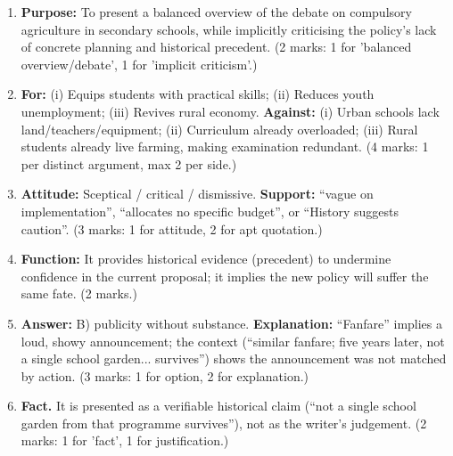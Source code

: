 \documentclass[11pt]{article}
\begin{document}
\begin{corrige}
\begin{enumerate}
\item \textbf{Purpose:} To present a balanced overview of the debate on compulsory agriculture in secondary schools, while implicitly criticising the policy's lack of concrete planning and historical precedent. (2 marks: 1 for 'balanced overview/debate', 1 for 'implicit criticism'.)
\item \textbf{For:} (i) Equips students with practical skills; (ii) Reduces youth unemployment; (iii) Revives rural economy. \textbf{Against:} (i) Urban schools lack land/teachers/equipment; (ii) Curriculum already overloaded; (iii) Rural students already live farming, making examination redundant. (4 marks: 1 per distinct argument, max 2 per side.)
\item \textbf{Attitude:} Sceptical / critical / dismissive. \textbf{Support:} ``vague on implementation'', ``allocates no specific budget'', or ``History suggests caution''. (3 marks: 1 for attitude, 2 for apt quotation.)
\item \textbf{Function:} It provides historical evidence (precedent) to undermine confidence in the current proposal; it implies the new policy will suffer the same fate. (2 marks.)
\item \textbf{Answer:} B) publicity without substance. \textbf{Explanation:} ``Fanfare'' implies a loud, showy announcement; the context (``similar fanfare; five years later, not a single school garden... survives'') shows the announcement was not matched by action. (3 marks: 1 for option, 2 for explanation.)
\item \textbf{Fact.} It is presented as a verifiable historical claim (``not a single school garden from that programme survives''), not as the writer's judgement. (2 marks: 1 for 'fact', 1 for justification.)
\end{enumerate}
\end{corrige}
\end{document}
